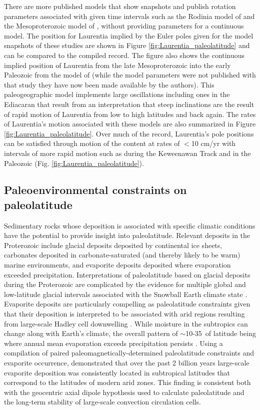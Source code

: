 \documentclass[twocolumn, switch]{article} %
\begin{document}
There are more published models that show snapshots and publish rotation parameters associated with given time intervals such as the Rodinia model of \cite{Li2008a} and the Mesoproterozoic model of \cite{Pisarevsky2014b}, without providing parameters for a continuous model. The position for Laurentia implied by the Euler poles given for the model snapshots of these studies are shown in Figure \ref{fig:Laurentia_paleolatitude} and can be compared to the compiled record. The figure also shows the continuous implied position of Laurentia from the late Mesoproterozoic into the early Paleozoic from the model of \citet{Li2013a} (while the model parameters were not published with that study they have now been made available by the authors). This paleogeographic model implements large oscillations including ones in the Ediacaran that result from an interpretation that steep inclinations are the result of rapid motion of Laurentia from low to high latitudes and back again. The rates of Laurentia's motion associated with these models are also summarized in Figure \ref{fig:Laurentia_paleolatitude}. Over much of the record, Laurentia's pole positions can be satisfied through motion of the content at rates of $<$10 cm/yr with intervals of more rapid motion such as during the Keweenawan Track and in the Paleozoic (Fig. \ref{fig:Laurentia_paleolatitude}).

\subsection{Paleoenvironmental constraints on paleolatitude}

Sedimentary rocks whose deposition is associated with specific climatic conditions have the potential to provide insight into paleolatitude. Relevant deposits in the Proterozoic include glacial deposits deposited by continental ice sheets, carbonates deposited in carbonate-saturated (and thereby likely to be warm) marine environments, and evaporite deposits deposited where evaporation exceeded precipitation. Interpretations of paleolatitude based on glacial deposits during the Proterozoic are complicated by the evidence for multiple global and low-latitude glacial intervals associated with the Snowball Earth climate state \citep{Evans2003b}. Evaporite deposits are particularly compelling as paleolatitude constraints given that their deposition is interpreted to be associated with arid regions resulting from large-scale Hadley cell downwelling \citep{Evans2006a}. While moisture in the subtropics can change along with Earth's climate, the overall pattern of $\sim$10-35\textdegree\ of latitude being where annual mean evaporation exceeds precipitation persists \citep{Burls2017a}. Using a compilation of paired paleomagnetically-determined paleolatitude constraints and evaporite occurrence, \cite{Evans2006a} demonstrated that over the past 2 billion years large-scale evaporite deposition was consistently located in subtropical latitudes that correspond to the latitudes of modern arid zones. This finding is consistent both with the geocentric axial dipole hypothesis used to calculate paleolatitude and the long-term stability of large-scale convection circulation cells. 
\end{document}
